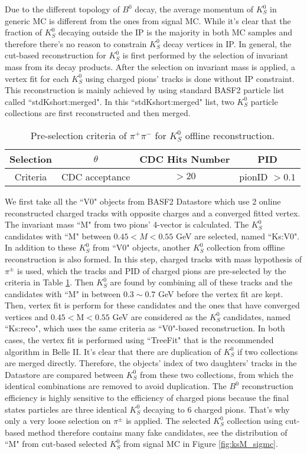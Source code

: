  Due to the different topology of $B^0$ decay, the average momentum of $K_S^0$ in generic MC is different from the ones from signal MC. While it's clear that the fraction of $K_S^0$ decaying outside the IP is the majority in both MC samples and therefore there's no reason to constrain $K_S^0$ decay vertices in IP. In general, the cut-based reconstruction for $K_S^0$ is first performed by the selection of invariant mass from its decay products. After the selection on invariant mass is applied, a vertex fit for each $K_S^0$ using charged pions' tracks is done without IP constraint. This reconstruction is mainly achieved by using standard BASF2 particle list called ``stdKshort:merged". In this ``stdKshort:merged" list, two $K_S^0$ particle collections are first reconstructed and then merged.
  \begin{table}[htbp]
  	\centering
  	\large
  	\caption{Pre-selection criteria of $\pi^+ \pi^-$ for $K_S^0$ offline reconstruction.}
  	\label{tab:kspipi_select}
  	\begin{tabular}{c c c c }
  		\toprule
  		Selection & $\theta$ & CDC Hits Number & PID  \\
  		\hline
  		Criteria  & CDC acceptance &  $>20$ & pionID $> 0.1$\\
  		\bottomrule
  	\end{tabular}
  \end{table}
  We first take all the ``V0" objects from BASF2 Datastore which use 2 online reconstructed charged tracks with opposite charges and a converged fitted vertex. The invariant mass ``M" from two pions' 4-vector is calculated. The $K_S^0$ candidates with ``M" between $0.45 < M < 0.55$ GeV are selected, named ``Ks:V0". In addition to these $K_S^0$ from ``V0" objects, another $K_S^0$ collection from offline reconstruction is also formed. In this step, charged tracks with mass hypothesis of $\pi^{\pm}$ is used, which the tracks and PID of charged pions are pre-selected by the criteria in Table \ref{tab:kspipi_select}. Then $K_S^0$ are found by combining all of these tracks and the candidates with ``M" in between $0.3 \sim 0.7$ GeV before the vertex fit are kept. Then, vertex fit is perform for these candidates and the ones that have converged vertices and $0.45 < \text{M} < 0.55$ GeV are considered as the $K_S^0$ candidates, named ``Ks:reco", which uses the same criteria as ``V0"-based reconstruction. In both cases, the vertex fit is performed using ``TreeFit"\cite{krohn2020global} that is the recommended algorithm in Belle II. It's clear that there are duplication of $K_S^0$ if two collections are merged directly. Therefore, the objects' index of two daughters' tracks in the Datastore are compared between $K_S^0$ from these two collections, from which the identical combinations are removed to avoid duplication. The $B^0$ reconstruction efficiency is highly sensitive to the efficiency of charged pions because the final states particles are three identical $K_S^0$ decaying to 6 charged pions. That's why only a very loose selection on $\pi^{\pm}$ is applied. The selected $K_S^0$ collection using cut-based method therefore contains many fake candidates, see the distribution of ``M" from cut-based selected $K_S^0$ from signal MC in Figure \ref{fig:ksM_sigmc}.
